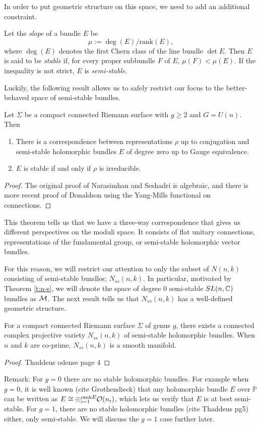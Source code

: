 	In order to put geometric structure on this space, we need to add an additional constraint.
	\begin{definition}
		Let the \emph{slope} of a bundle $E$ be
		$$\mu := \deg(E)/\text{rank}(E),$$
		where $\deg(E)$ denotes the first Chern class of the line bundle $\det E$. Then $E$ is said to be \textit{stable} if, for every proper subbundle $F$ of $E$, $\mu(F) < \mu(E)$. If the inequality is not strict, $E$ is \textit{semi-stable}.
	\end{definition}
	Luckily, the following result allows us to safely restrict our focus to the better-behaved space of semi-stable bundles.
	\begin{theorem}
		\label{t:n-s}
		Let $\Sigma$ be a compact connected Riemann surface with $g\geq 2$ and $G=U(n)$. Then 
		\begin{enumerate}
			\item There is a correspondence between representations $\rho$ up to conjugation and semi-stable holomorphic bundles $E$ of degree zero up to Gauge equivalence.
			\item $E$ is stable if and only if $\rho$ is irreducible.
		\end{enumerate}
	\end{theorem}
	\begin{proof}
		The original proof of Narasimhan and Seshadri \cite{narasimhan_stable_1965} is algebraic, and there is more recent proof of Donaldson \cite{donaldson_new_1983} using the Yang-Mills functional on connections.
	\end{proof}
	This theorem tells us that we have a three-way correspondence that gives us different perspectives on the moduli space. It consists of flat unitary connections, representations of the fundamental group, or semi-stable holomorphic vector bundles.
	
	For this reason, we will restrict our attention to only the subset of $N(n,k)$ consisting of semi-stable bundles; $N_{ss}(n,k)$. In particular, motivated by Theorem \ref{t:n-s}, we will denote the space of degree $0$ semi-stable $SL(n,\mathbb{C})$ bundles as $\mathcal{M}$. The next result tells us that $N_{ss}(n,k)$ has a well-defined geometric structure. 
	\begin{theorem}
		For a compact connected Riemann surface $\Sigma$ of genus $g$, there exists a connected complex projective variety $N_{ss}(n,k)$ of semi-stable  holomorphic bundles. When $n$ and $k$ are co-prime, $N_{ss}(n,k)$ is a smooth manifold. 
	\end{theorem}
	\begin{proof}
		Thaddeus odense page 4
	\end{proof}
	Remark: For $g=0$ there are no stable holomorphic bundles. For example when $g=0$, it is well known (cite Grothendieck) that any holomorphic bundle $E$ over $\mathbb{P}$ can be written as $E \cong \oplus_{i=1}^{\text{rank} E} \mathcal{O}(n_i)$, which lets us verify that $E$ is at best semi-stable. For $g=1$, there are no stable holomorphic bundles (cite Thaddeus pg5) either, only semi-stable. We will discuss the $g=1$ case further later.

